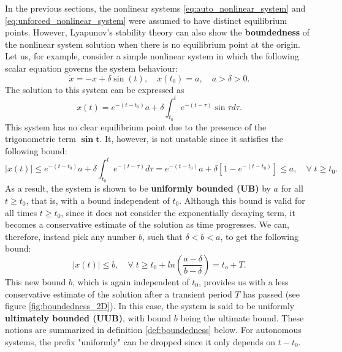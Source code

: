 In the previous sections, the nonlinear systems \eqref{eq:auto_nonlinear_system} and \eqref{eq:unforced_nonlinear_system} were assumed to have distinct equilibrium points. However, Lyapunov's stability theory can also show the \textbf{boundedness} of the nonlinear system solution when there is no equilibrium point at the origin. Let us, for example, consider a simple nonlinear system in which the following scalar equation governs the system behaviour:
\begin{equation}
  \dot{ x }=- x + \delta \sin{\left( t \right)}, \quad x \left(t_0\right)= a, \quad a > \delta > 0.
\end{equation}
The solution to this system can be expressed as
\begin{equation}
  x \left( t \right) = e^{-\left(t-t_0\right)} a + \delta \int_{t_0}^{t}e^{-\left( t - \tau \right)} \sin{\tau} d\tau.
\end{equation}
This system has no clear equilibrium point due to the presence of the trigonometric term $\boldsymbol{\sin{t}}$. It, however, is not unstable since it satisfies the following bound:
\begin{equation}
  \left| x \left( t \right)\right| \le e^{-\left( t -t_0\right)} a + \delta \int_{t_0}^{ t }e^{-\left( t - \tau \right)} d\tau = e^{-\left(t -t_0 \right)}a + \delta \left[ 1 -e^{-\left( t -t_0\right)} \right] \le a,
  \quad \forall \; t \ge t_0.
\end{equation}
As a result, the system is shown to be \textbf{uniformly bounded (UB)} by $a$ for all $t \geq t_0$, that is, with a bound independent of $t_0$. Although this bound is valid for all times $t \geq t_0$, since it does not consider the exponentially decaying term, it becomes a conservative estimate of the solution as time progresses. We can, therefore, instead pick any number $b$, such that $\delta < b < a$, to get the following bound:
\begin{equation}
  \left| x \left( t \right)\right|\le b ,\quad \forall \; t \geq t_0 + ln {\left(\frac{ a - \delta }{ b - \delta }\right)}= t_o + T.
\end{equation}
This new bound $b$, which is again independent of $t_0$, provides us with a less conservative estimate of the solution after a transient period $T$ has passed (see figure \ref{fig:boundedness_2D}). In this case, the system is said to be uniformly \textbf{ultimately bounded (UUB)}, with bound $b$ being the ultimate bound. These notions are summarized in definition \ref{def:boundedness} below. For autonomous systems, the prefix "uniformly" can be dropped since it only depends on $t-t_0$.

